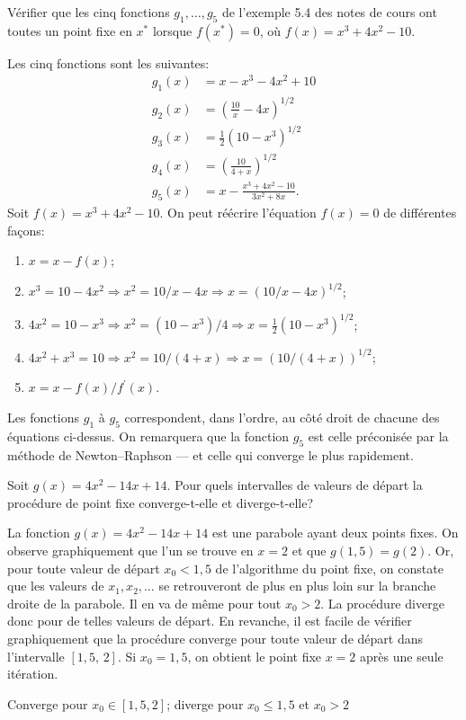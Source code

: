 \begin{exercice}
  Vérifier que les cinq fonctions $g_1, \dots, g_5$ de l'exemple 5.4
  des notes de cours ont toutes un point fixe en $x^*$ lorsque $f(x^*)
  = 0$, où $f(x) = x^3 + 4x^2 - 10$.
  \begin{sol}
    Les cinq fonctions sont les suivantes:
    \begin{align*}
      g_1(x) &= x - x^3 - 4 x^2 + 10  \\
      g_2(x) &= \left( \frac{10}{x} - 4x \right)^{1/2} \\
      g_3(x) &= \frac{1}{2} (10 - x^3)^{1/2} \\
      g_4(x) &= \left( \frac{10}{4 + x} \right)^{1/2} \\
      g_5(x) &= x - \frac{x^3 + 4 x^2 - 10}{3x^2 + 8x}.
    \end{align*}
    Soit $f(x) = x^3 + 4x^2 - 10$. On peut réécrire l'équation $f(x) =
    0$ de différentes façons:
    \begin{enumerate}
    \item $x = x - f(x)$;
    \item $x^3 = 10 - 4x^2 \Rightarrow x^2 = 10/x - 4x \Rightarrow x =
      (10/x - 4x)^{1/2}$;
    \item $4x^2 = 10 - x^3 \Rightarrow x^2 = (10 - x^3)/4 \Rightarrow
      x = \frac{1}{2}(10 - x^3)^{1/2}$;
    \item $4x^2 +  x^3 = 10 \Rightarrow x^2 = 10/(4 + x) \Rightarrow x
      = (10/(4 + x))^{1/2}$;
    \item $x = x - f(x)/f^\prime(x)$.
    \end{enumerate}
    Les fonctions $g_1$ à $g_5$ correspondent, dans l'ordre, au côté
    droit de chacune des équations ci-dessus. On remarquera que la
    fonction $g_5$ est celle préconisée par la méthode de
    Newton--Raphson --- et celle qui converge le plus rapidement.
  \end{sol}
\end{exercice}

\begin{exercice}
  Soit $g(x) = 4x^2 - 14x + 14$. Pour quels intervalles de valeurs de
  départ la procédure de point fixe converge-t-elle et diverge-t-elle?
  \begin{sol}
    La fonction $g(x) = 4x^2 - 14x + 14$ est une parabole ayant deux
    points fixes. On observe graphiquement que l'un se trouve en $x =
    2$ et que $g(1,5) = g(2)$. Or, pour toute valeur de départ $x_0 <
    1,5$ de l'algorithme du point fixe, on constate que les valeurs de
    $x_1, x_2, \dots$ se retrouveront de plus en plus loin sur la
    branche droite de la parabole. Il en va de même pour tout $x_0 >
    2$. La procédure diverge donc pour de telles valeurs de départ. En
    revanche, il est facile de vérifier graphiquement que la procédure
    converge pour toute valeur de départ dans l'intervalle $[1,5,\,
    2]$. Si $x_0 = 1,5$, on obtient le point fixe $x = 2$ après une
    seule itération.
  \end{sol}
  \begin{rep}
    Converge pour $x_0 \in [1,5, 2]$; diverge pour $x_0 \leq 1,5$ et
    $x_0 > 2$
  \end{rep}
\end{exercice}

